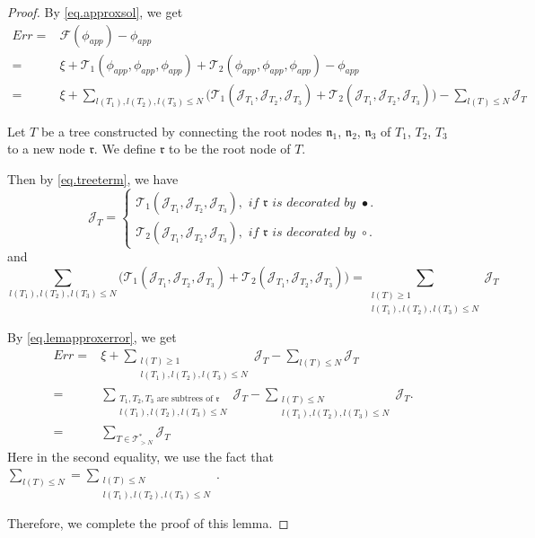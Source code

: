 \begin{proof} By \eqref{eq.approxsol}, we get
\begin{equation}\label{eq.lemapproxerror}
\begin{split}
    Err=&\mathcal{F}(\phi_{app})-\phi_{app}    
    \\
    =&\xi+\mathcal{T}_1(\phi_{app},\phi_{app},\phi_{app})+\mathcal{T}_2(\phi_{app},\phi_{app},\phi_{app})-\phi_{app}
    \\
    =&\xi+\sum_{l(T_1),l(T_2),l(T_3)\le N} \Big(\mathcal{T}_1(\mathcal{J}_{T_1},\mathcal{J}_{T_2},\mathcal{J}_{T_3})+\mathcal{T}_2(\mathcal{J}_{T_1},\mathcal{J}_{T_2},\mathcal{J}_{T_3})\Big)-\sum_{l(T)\le N} \mathcal{J}_T
\end{split}
\end{equation}

Let $T$ be a tree constructed by connecting the root nodes $\mathfrak{n}_1$, $\mathfrak{n}_2$, $\mathfrak{n}_3$ of $T_1$, $T_2$, $T_3$ to a new node $\mathfrak{r}$. We define $\mathfrak{r}$ to be the root node of $T$.

Then by \eqref{eq.treeterm}, we have
\begin{equation}
    \mathcal{J}_T=
    \begin{cases}
    \mathcal{T}_1(\mathcal{J}_{T_1}, \mathcal{J}_{T_2}, \mathcal{J}_{T_3}), \textit{ if }\mathfrak{r}\textit{ is decorated by }\bullet.
    \\
    \mathcal{T}_2(\mathcal{J}_{T_1}, \mathcal{J}_{T_2}, \mathcal{J}_{T_3}), \textit{ if }\mathfrak{r}\textit{ is decorated by }\circ.
    \end{cases}
\end{equation}
and 
\begin{equation}
    \sum_{l(T_1),l(T_2),l(T_3)\le N} \Big(\mathcal{T}_1(\mathcal{J}_{T_1},\mathcal{J}_{T_2},\mathcal{J}_{T_3})+\mathcal{T}_2(\mathcal{J}_{T_1},\mathcal{J}_{T_2},\mathcal{J}_{T_3})\Big)=\sum_{\substack{l(T)\ge 1\\ l(T_1),l(T_2),l(T_3)\le N}} \mathcal{J}_{T}
\end{equation}

By \eqref{eq.lemapproxerror}, we get
\begin{equation}
\begin{split}
    Err=&\xi+\sum_{\substack{l(T)\ge 1\\ l(T_1),l(T_2),l(T_3)\le N}} \mathcal{J}_{T}-\sum_{l(T)\le N} \mathcal{J}_T
    \\
    =&\sum_{\substack{T_1,T_2,T_3\text{ are subtrees of }\mathfrak{r}\\ l(T_1),l(T_2),l(T_3)\le N}} \mathcal{J}_{T}-\sum_{\substack{l(T)\le N\\ l(T_1),l(T_2),l(T_3)\le N}} \mathcal{J}_T.
    \\
    =&\sum_{T\in \mathcal{T}_{>N}^*} \mathcal{J}_T
\end{split}
\end{equation}
Here in the second equality, we use the fact that $\sum_{l(T)\le N}=\sum_{\substack{l(T)\le N\\ l(T_1),l(T_2),l(T_3)\le N}}$.

Therefore, we complete the proof of this lemma.
\end{proof}

